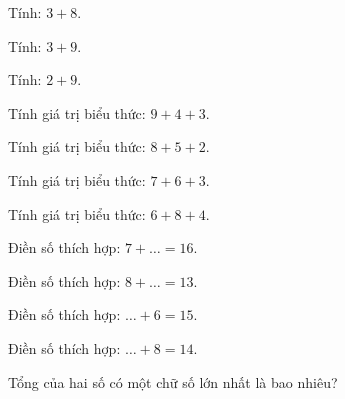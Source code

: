 \begin{ex}
Tính: $3 + 8$.
\end{ex}

\begin{ex}
Tính: $3 + 9$.
\end{ex}

\begin{ex}
Tính: $2 + 9$.
\end{ex}

\begin{ex}
Tính giá trị biểu thức: $9 + 4 + 3$.
\end{ex}

\begin{ex}
Tính giá trị biểu thức: $8 + 5 + 2$.
\end{ex}

\begin{ex}
Tính giá trị biểu thức: $7 + 6 + 3$.
\end{ex}

\begin{ex}
Tính giá trị biểu thức: $6 + 8 + 4$.
\end{ex}

\begin{ex}
Điền số thích hợp: $7 + \dots = 16$.
\end{ex}

\begin{ex}
Điền số thích hợp: $8 + \dots = 13$.
\end{ex}

\begin{ex}
Điền số thích hợp: $\dots + 6 = 15$.
\end{ex}

\begin{ex}
Điền số thích hợp: $\dots + 8 = 14$.
\end{ex}

\begin{ex}
Tổng của hai số có một chữ số lớn nhất là bao nhiêu?
\end{ex}
